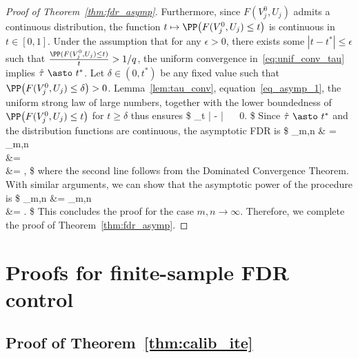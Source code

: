 \begin{proof}[Proof of Theorem~\ref{thm:fdr_asymp}]
Furthermore, since $F(V_j^0,U_j)$ admits a continuous distribution,
the function $t\mapsto \PP\big( F(V_j^0, U_j) \leq t \big)$ is continuous in $t\in [0,1]$.
Under the assumption that for any $\epsilon>0$, there exists
some $|t-t^*|\leq \epsilon$ such that $\frac{\PP ( F(V_j^0, U_j) \leq t)}{t}>1/q$,
the uniform convergence in~\eqref{eq:unif_conv_tau} implies $\hat\tau ~\asto~ t^*$.
Let $\delta \in (0, t^*)$ be any fixed value
such that $\PP\big( F(V_j^0, U_j) \leq \delta \big)>0$.
Lemma~\ref{lem:tau_conv}, equation~\eqref{eq_asymp_1},
the uniform strong law of large numbers, together with the lower boundedness
of $\PP\big( F(V_j^0, U_j) \leq t  \big) $ for $t\geq \delta$ thus ensures
\$
\sup_{t\in [\delta,1]} \Bigg| - \Bigg| ~\asto~ 0.
\$
Since $\hat\tau ~\asto ~  t^*$ and the distribution functions are continuous, the asymptotic FDR is
\$
\limsup_{m,n\to\infty} \fdr &
= \limsup_{m,n\to \infty} \EE\Bigg[\frac{\sum_{j=1}^m  \ind\{\hat{F}_n(V_j^0, U_j,W_j) \leq \hat\tau, j\in \cH_0\}}{1\vee \sum_{j=1}^m \ind\{\hat{F}_n(V_j^0, U_j,W_j) \leq \hat\tau\}} \Bigg] \\
&=  \EE\Bigg[\limsup_{m,n\to \infty}\frac{\sum_{j=1}^m  \ind\{\hat{F}_n(V_j^0, U_j,W_j) \leq \hat\tau, j\in \cH_0\}}{1\vee \sum_{j=1}^m \ind\{\hat{F}_n(V_j^0, U_j,W_j) \leq \hat\tau\}} \Bigg] \\
&= ,
\$
where the second line follows from the Dominated Convergence Theorem.
With similar arguments, we can show that the asymptotic power of the procedure is
\$
\limsup_{m,n\to\infty}   &=
\limsup_{m,n\to \infty} \EE\Bigg[\frac{\sum_{j=1}^m  \ind\{\hat{F}_n(V_j^0, U_j,W_j) \leq \hat\tau, j\notin \cH_0\}}{1\vee \sum_{j=1}^m \ind\{Y_{n+j} >C_{n+j} \}} \Bigg] \\
&= .
\$
This concludes the proof for the case $m,n\to \infty$.
Therefore, we complete the proof of Theorem~\ref{thm:fdr_asymp}.
\end{proof}


\section{Proofs for finite-sample FDR control}


\subsection{Proof of Theorem~\ref{thm:calib_ite}}
\label{app:thm_calib_ite}

